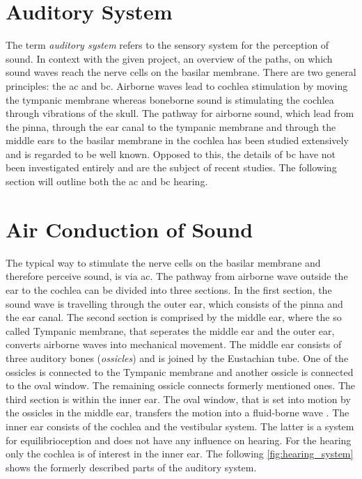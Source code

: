 \section{Auditory System}
The term \textit{auditory system} refers to the sensory system for the perception of sound. In context with the given project, an overview of the paths, on which sound waves reach the nerve cells on the basilar membrane. There are two general principles: the \gls{ac} and \gls{bc}. Airborne waves lead to cochlea stimulation by moving the tympanic membrane whereas boneborne sound is stimulating the cochlea through vibrations of the skull. The pathway for airborne sound, which lead from the pinna, through the ear canal to the tympanic membrane and through the middle ears to the basilar membrane in the cochlea has been studied extensively and is regarded to be well known. Opposed to this, the details of \gls{bc} have not been investigated entirely \citep{stenfelt_2005} and are the subject of recent studies. The following section will outline both the \gls{ac} and \gls{bc} hearing.


\section{Air Conduction of Sound}
The typical way to stimulate the nerve cells on the basilar membrane and therefore perceive sound, is via \gls{ac}. The pathway from airborne wave outside the ear to the cochlea can be divided into three sections. In the first section, the sound wave is travelling through the outer ear, which consists of the pinna and the ear canal. The second section is comprised by the middle ear, where the so called Tympanic membrane, that seperates the middle ear and the outer ear, converts airborne waves into mechanical movement. The middle ear consists of three auditory bones (\textit{ossicles}) and is joined by the Eustachian tube. One of the ossicles is connected to the Tympanic membrane and another ossicle is connected to the oval window. The remaining ossicle connects formerly mentioned ones. The third section is within the inner ear. The oval window, that is set into motion by the ossicles in the middle ear, transfers the motion into a fluid-borne wave \citep{ho_2017}. The inner ear consists of the cochlea and the vestibular system. The latter is a system for equilibrioception and does not have any influence on hearing. For the hearing only the cochlea is of interest in the inner ear. The following \autoref{fig:hearing_system} shows the formerly described parts of the auditory system.



